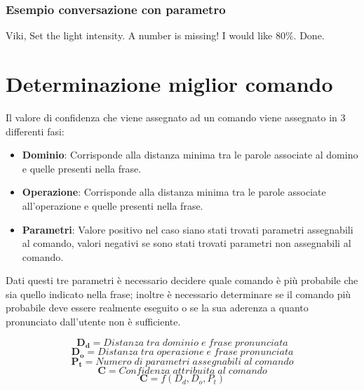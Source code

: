 \documentclass[twoside]{supsistudent}
\begin{document}
\subsection{Esempio conversazione con parametro}
\begin{dialogue}
 Viki, Set the light intensity.
 A number is missing!
 I would like 80\%.
 Done.
\end{dialogue}



\chapter{Determinazione miglior comando}
Il valore di confidenza che viene assegnato ad un comando viene assegnato in 3 differenti fasi:
\begin{itemize}
  \item \textbf{Dominio}: Corrisponde alla distanza minima tra le parole associate al domino e quelle presenti nella frase.
  \item \textbf{Operazione}: Corrisponde alla distanza minima tra le parole associate all'operazione e quelle presenti nella frase.
  \item \textbf{Parametri}: Valore positivo nel caso siano stati trovati parametri assegnabili al comando, valori negativi se sono stati trovati parametri non assegnabili al comando.
\end{itemize}
Dati questi tre parametri è necessario decidere quale comando è più probabile che sia quello indicato nella frase; inoltre è necessario determinare se il comando più probabile deve essere realmente eseguito o se la sua aderenza a quanto pronunciato dall'utente non è sufficiente.
\begin{center}
\[
\boldsymbol{D_{d}} = Distanza\;tra\;dominio\;e\;frase\;pronunciata
\]
\[
\boldsymbol{D_{o}} = Distanza\;tra\;operazione\;e\;frase\;pronunciata
\]
\[
\boldsymbol{P_{t}} = Numero\;di\;parametri\;assegnabili\;al\;comando
\]
\[
\boldsymbol{C} = Confidenza\;attribuita\;al\;comando
\]
\[
\boldsymbol{C} = f(D_{d} ,D_{o},P_{t})
\]
\end{center}
\newpage
\end{document}
